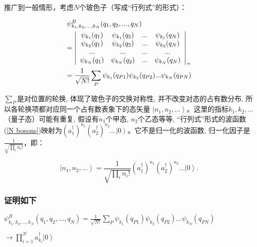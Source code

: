 推广到一般情形，考虑$N$个玻色子（写成“行列式”的形式）：


\begin{equation}\label{N bosons}
\begin{gathered}
\psi_{k_1,k_2,...,k_N}^B(q_1,q_2,...,q_N) \hfill \\
= \left|
{\begin{array}{*{20}c}
   {\psi _{k_1 } (q_1 )} & {\psi _{k_1 } (q_2 )} & {...} & {\psi _{k_1 } (q_N )}  \\
   {\psi _{k_2 } (q_1 )} & {\psi _{k_2 } (q_2 )} & {...} & {\psi _{k_2 } (q_N )}  \\
   {...} & {...} & {...} & {...}  \\
   {\psi _{k_N } (q_1 )} & {\psi _{k_N } (q_2 )} & {...} & {\psi _{k_N } (q_N )}  \\
 \end{array} } \right|_ + \hfill \\
= \frac{1}{\sqrt {N!}} \sum\limits_P \psi_{k_1}(q_{P1})
\psi_{k_2}(q_{P2})...\psi_{k_N}(q_{PN}) \hfill \\
\end{gathered}
\end{equation}


$\sum\limits_P$是对位置的轮换, 体现了玻色子的交换对称性,
并不改变对态的占有数分布,
所以各轮换项都对应同一个占有数表象下的态矢量 $\left|n_1,n_2,...
\right\rangle$。这里的指标$k_1,k_2,...$（量子态）可能有重复,
假设有$n_1$个甲态, $n_2$个乙态等等, “行列式”形式的波函数(\ref{N
bosons})映射为$(a_1^{\dagger})^{n_1} (a_2^{\dagger})^{n_2}... \left|
0 \right\rangle$。它不是归一化的波函数, 归一化因子是$\frac{1}{{\sqrt
{\prod\limits_i {n_i !} } }}$，即：

\begin{equation}\label{Normalized bosons occ rep}
\left| {n_1 ,n_2 ,...} \right\rangle = \frac{1}{{\sqrt {
\prod\limits_i {n_i !} } }} (a_1^{\dagger})^{n_1}
(a_2^{\dagger})^{n_2} ... \left| 0 \right\rangle .
\end{equation}



\subsubsection*{证明如下}

\begin{center}

$\psi_{k_1,k_2,...,k_N}^B(q_1,q_2,...,q_N) = \frac{1}{\sqrt {N!}}
\sum\limits_P \psi_{k_1}(q_{P1})
\psi_{k_2}(q_{P2})...\psi_{k_N}(q_{PN})$

$\to \prod\limits_{i = 1}^N {a_{k_i }^\dag  \left| 0 \right\rangle
}$

\end{center}


